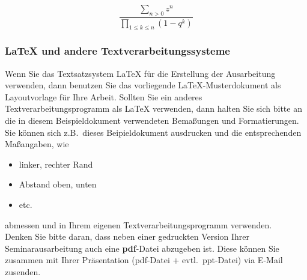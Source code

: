 \begin{equation}\label{formel1}
\frac{\sum_{n > 0} z^n}
{\prod_{1\leq k\leq n} (1-q^k)}
\end{equation}


\subsubsection{{\LaTeX} und andere Textverarbeitungssysteme}
Wenn Sie das Textsatzsystem {\LaTeX}\index{\LaTeX} für die Erstellung der Ausarbeitung verwenden, dann benutzen Sie das vorliegende \LaTeX-Musterdokument als Layoutvorlage für Ihre Arbeit.
Sollten Sie ein anderes Textverarbeitungsprogramm als {\LaTeX} verwenden, dann halten Sie sich bitte an die in diesem Beispieldokument verwendeten Bemaßungen und Formatierungen.
Sie können sich z.B.~dieses Beipieldokument ausdrucken und die entsprechenden Maßangaben, wie 
\begin{itemize}
\item linker, rechter Rand
\item Abstand oben, unten
\item etc.
\end{itemize}
abmessen und in Ihrem eigenen Textverarbeitungsprogramm verwenden. \\
Denken Sie bitte daran, dass neben einer gedruckten Version Ihrer Seminarausarbeitung auch eine {\bf pdf}-Datei abzugeben ist.
Diese können Sie zusammen mit Ihrer Präsentation (pdf-Datei + evtl.~ppt-Datei) via E-Mail zusenden.
